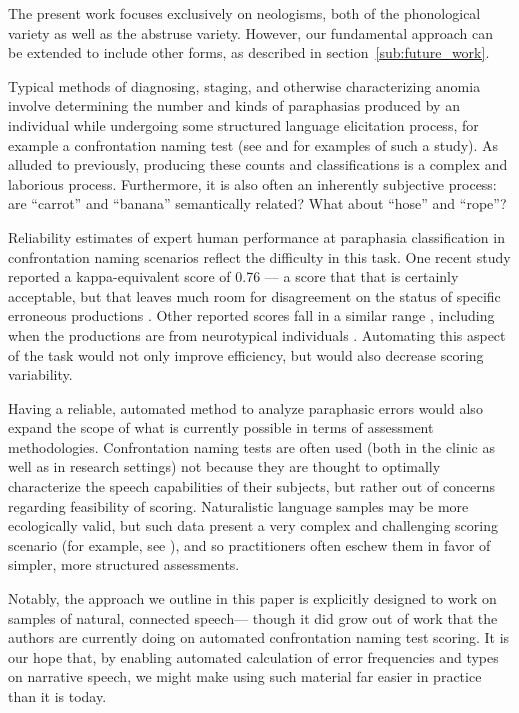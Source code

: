 \documentclass[11pt,letterpaper]{article}
\begin{document}
The present work focuses exclusively on neologisms, both of the phonological variety as well as the abstruse variety. However, our fundamental approach can be extended to include other forms, as described in section~\ref{sub:future_work}.

Typical methods of diagnosing, staging, and otherwise characterizing anomia involve determining the number and kinds of paraphasias produced by an individual while undergoing some structured language elicitation process, for example a confrontation naming test (see \cite{Kendall:2013hm} and \cite{Brookshire:2014fa} for examples of such a study).
As alluded to previously, producing these counts and classifications is a complex and laborious process.
Furthermore, it is also often an inherently subjective process: are ``carrot'' and ``banana'' semantically related?
What about ``hose'' and ``rope''?

Reliability estimates of expert human performance at paraphasia classification in confrontation naming scenarios reflect the difficulty in this task. One recent study reported a kappa-equivalent score of 0.76 --- a score that that is certainly acceptable, but that leaves much room for disagreement on the status of specific erroneous productions \cite{Minkina:2015dz}.
Other reported scores fall in a similar range \cite{doi:10.1080/02687038.2014.973359}, including when the productions are from neurotypical individuals \cite{doi:10.1080/02687038908249023}.
Automating this aspect of the task would not only improve efficiency, but would also decrease scoring variability.

Having a reliable, automated method to analyze paraphasic errors would also expand the scope of what is currently possible in terms of assessment methodologies.
Confrontation naming tests are often used (both in the clinic as well as in research settings) not because they are thought to optimally characterize the speech capabilities of their subjects, but rather out of concerns regarding feasibility of scoring.
Naturalistic language samples may be more ecologically valid, but such data present a very complex and challenging scoring scenario (for example, see \cite{Nicholas:1993wl,Berndt:2000aa,Rochon:2000js}), and so practitioners often eschew them in favor of simpler, more structured assessments.

Notably, the approach we outline in this paper is explicitly designed to work on samples of natural, connected speech--- though it did grow out of work that the authors are currently doing on automated confrontation naming test scoring.
It is our hope that, by enabling automated calculation of  error frequencies and types on narrative speech, we might make using such material far easier in practice than it is today.
\end{document}

